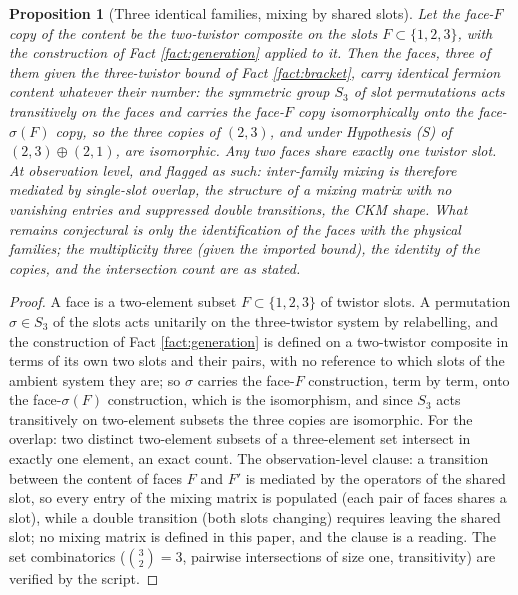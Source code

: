 \documentclass[11pt]{article}
\newtheorem{proposition}[theorem]{Proposition}
\theoremstyle{definition}
\begin{document}
\begin{proposition}[Three identical families, mixing by shared slots]\label{prop:identical}
Let the face-$F$ copy of the content be the two-twistor composite on the slots $F \subset \{1,2,3\}$, with the construction of Fact \ref{fact:generation} applied to it. Then the faces, three of them given the three-twistor bound of Fact \ref{fact:bracket}, carry identical fermion content whatever their number: the symmetric group $S_{3}$ of slot permutations acts transitively on the faces and carries the face-$F$ copy isomorphically onto the face-$\sigma(F)$ copy, so the three copies of $(2,3)$, and under Hypothesis (S) of $(2,3) \oplus (2,1)$, are isomorphic. Any two faces share exactly one twistor slot. At observation level, and flagged as such: inter-family mixing is therefore mediated by single-slot overlap, the structure of a mixing matrix with no vanishing entries and suppressed double transitions, the CKM shape. What remains conjectural is only the identification of the faces with the physical families; the multiplicity three (given the imported bound), the identity of the copies, and the intersection count are as stated.
\end{proposition}

\begin{proof}
A face is a two-element subset $F \subset \{1, 2, 3\}$ of twistor slots. A permutation $\sigma \in S_{3}$ of the slots acts unitarily on the three-twistor system by relabelling, and the construction of Fact \ref{fact:generation} is defined on a two-twistor composite in terms of its own two slots and their pairs, with no reference to which slots of the ambient system they are; so $\sigma$ carries the face-$F$ construction, term by term, onto the face-$\sigma(F)$ construction, which is the isomorphism, and since $S_{3}$ acts transitively on two-element subsets the three copies are isomorphic. For the overlap: two distinct two-element subsets of a three-element set intersect in exactly one element, an exact count. The observation-level clause: a transition between the content of faces $F$ and $F'$ is mediated by the operators of the shared slot, so every entry of the mixing matrix is populated (each pair of faces shares a slot), while a double transition (both slots changing) requires leaving the shared slot; no mixing matrix is defined in this paper, and the clause is a reading. The set combinatorics ($\binom{3}{2} = 3$, pairwise intersections of size one, transitivity) are verified by the script.
\end{proof}
\end{document}
